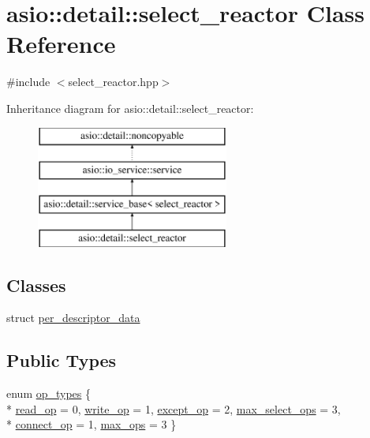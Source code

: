 \hypertarget{classasio_1_1detail_1_1select__reactor}{}\section{asio\+:\+:detail\+:\+:select\+\_\+reactor Class Reference}
\label{classasio_1_1detail_1_1select__reactor}


{\ttfamily \#include $<$select\+\_\+reactor.\+hpp$>$}

Inheritance diagram for asio\+:\+:detail\+:\+:select\+\_\+reactor\+:\begin{figure}[H]
\begin{center}
\leavevmode
\includegraphics[height=4.000000cm]{classasio_1_1detail_1_1select__reactor}
\end{center}
\end{figure}
\subsection*{Classes}
\begin{DoxyCompactItemize}
\item 
struct \hyperlink{structasio_1_1detail_1_1select__reactor_1_1per__descriptor__data}{per\+\_\+descriptor\+\_\+data}
\end{DoxyCompactItemize}
\subsection*{Public Types}
\begin{DoxyCompactItemize}
\item 
enum \hyperlink{classasio_1_1detail_1_1select__reactor_aa68ba3d214f9f046a27ad6b4ad743b37}{op\+\_\+types} \{ \\*
\hyperlink{classasio_1_1detail_1_1select__reactor_aa68ba3d214f9f046a27ad6b4ad743b37ab22de8bbf84e6d43de4e6f6a8bf70da5}{read\+\_\+op} = 0, 
\hyperlink{classasio_1_1detail_1_1select__reactor_aa68ba3d214f9f046a27ad6b4ad743b37a0d28233dd5e828b1e17ae9989d33a74d}{write\+\_\+op} = 1, 
\hyperlink{classasio_1_1detail_1_1select__reactor_aa68ba3d214f9f046a27ad6b4ad743b37a12faaedfaf78763570a2db254b6698df}{except\+\_\+op} = 2, 
\hyperlink{classasio_1_1detail_1_1select__reactor_aa68ba3d214f9f046a27ad6b4ad743b37a6ad9d2ec476a32b5c7d1edc68ada6504}{max\+\_\+select\+\_\+ops} = 3, 
\\*
\hyperlink{classasio_1_1detail_1_1select__reactor_aa68ba3d214f9f046a27ad6b4ad743b37af9e5ef1037c31bf9fcfc88032dc7f9e9}{connect\+\_\+op} = 1, 
\hyperlink{classasio_1_1detail_1_1select__reactor_aa68ba3d214f9f046a27ad6b4ad743b37a2fce81cdf971a8af0c04fa6fea53ca92}{max\+\_\+ops} = 3
 \}
\end{DoxyCompactItemize}
